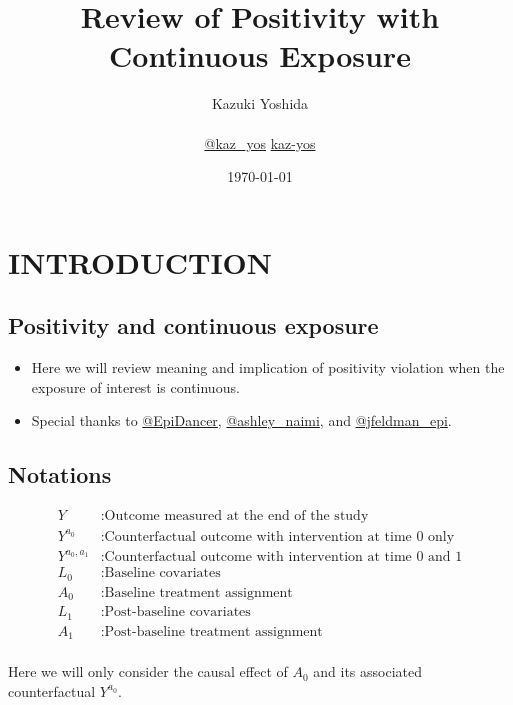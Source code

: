 \documentclass[dvipdfmx,10pt]{article}
\author{Kazuki Yoshida \\ \\ \faTwitter \href{https://twitter.com/kaz\_yos}{@kaz\_yos} \faGithub \href{https://github.com/kaz-yos/}{kaz-yos}}
\date{\today\\}
\title{Review of Positivity with Continuous Exposure}
\begin{document}
\maketitle
\sloppy
\section{INTRODUCTION}
\label{sec:orgcdbb454}
\subsection{Positivity and continuous exposure}
\label{sec:org19b1033}
\begin{itemize}
\item Here we will review meaning and implication of positivity violation when the exposure of interest is continuous.
\item Special thanks to \href{https://twitter.com/EpiDancer/status/1135741241386328065}{@EpiDancer}, \href{https://twitter.com/ashley\_naimi/status/1136045624724529153}{@ashley\_naimi}, and \href{https://twitter.com/jfeldman\_epi/status/1136116613630103553}{@jfeldman\_epi}.
\end{itemize}

\subsection{Notations}
\label{sec:org5c8b59d}
\begin{align*}
  Y &: \text{Outcome measured at the end of the study}\\
  Y^{a_{0}} &: \text{Counterfactual outcome with intervention at time 0 only}\\
  Y^{a_{0},a_{1}} &: \text{Counterfactual outcome with intervention at time 0 and 1}\\
  L_{0} &: \text{Baseline covariates}\\
  A_{0} &: \text{Baseline treatment assignment}\\
  L_{1} &: \text{Post-baseline covariates}\\
  A_{1} &: \text{Post-baseline treatment assignment}\\
\end{align*}

Here we will only consider the causal effect of \(A_{0}\) and its associated counterfactual \(Y^{a_{0}}\).
\end{document}
